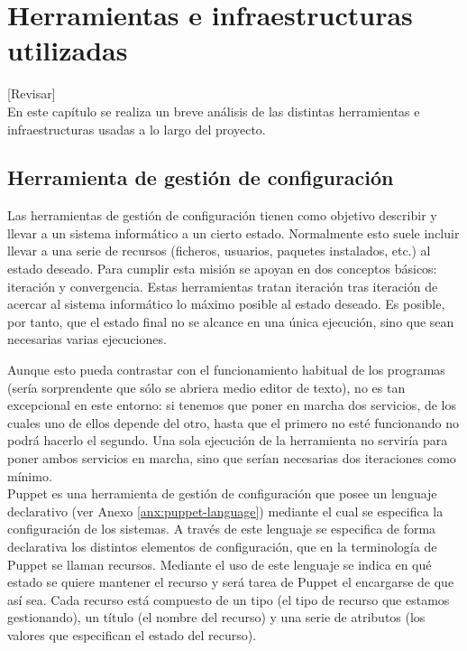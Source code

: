 \chapter{Herramientas e infraestructuras utilizadas}
\label{cap:analisis}

[Revisar]\\

En este capítulo se realiza un breve análisis de las distintas herramientas e infraestructuras usadas a lo largo del proyecto.


\section{Herramienta de gestión de configuración}

Las herramientas de gestión de configuración tienen como objetivo describir y llevar a un sistema informático a un cierto estado. Normalmente esto suele incluir llevar a una serie de recursos (ficheros, usuarios, paquetes instalados, etc.) al estado deseado. Para cumplir esta misión se apoyan en dos conceptos básicos: iteración y convergencia. Estas herramientas tratan iteración tras iteración de acercar al sistema informático lo máximo posible al estado deseado. Es posible, por tanto, que el estado final no se alcance en una única ejecución, sino que sean necesarias varias ejecuciones.

Aunque esto pueda contrastar con el funcionamiento habitual de los programas (sería sorprendente que sólo se abriera medio editor de texto), no es tan excepcional en este entorno: si tenemos que poner en marcha dos servicios, de los cuales uno de ellos depende del otro, hasta que el primero no esté funcionando no podrá hacerlo el segundo. Una sola ejecución de la herramienta no serviría para poner ambos servicios en marcha, sino que serían necesarias dos iteraciones como mínimo. \\

Puppet \cite{puppetlabs} es una herramienta de gestión de configuración que posee un lenguaje declarativo (ver Anexo \ref{anx:puppet-language}) mediante el cual se especifica la configuración de los sistemas. A través de este lenguaje se especifica de forma declarativa los distintos elementos de configuración, que en la terminología de Puppet se llaman recursos. Mediante el uso de este lenguaje se indica en qué estado se quiere mantener el recurso y será tarea de Puppet el encargarse de que así sea. Cada recurso está compuesto de un tipo (el tipo de recurso que estamos gestionando), un título (el nombre del recurso) y una serie de atributos (los valores que especifican el estado del recurso). 

